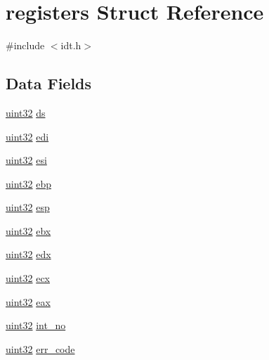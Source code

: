\hypertarget{structregisters}{
\section{registers Struct Reference}
\label{structregisters}
}


{\ttfamily \#include $<$idt.h$>$}

\subsection*{Data Fields}
\begin{DoxyCompactItemize}
\item 
\hyperlink{int__types_8h_a1134b580f8da4de94ca6b1de4d37975e}{uint32} \hyperlink{structregisters_a5bca43779caa99b6546c67c92fa96795}{ds}
\item 
\hyperlink{int__types_8h_a1134b580f8da4de94ca6b1de4d37975e}{uint32} \hyperlink{structregisters_a21389bd4fcf274118c6adf12a24c9889}{edi}
\item 
\hyperlink{int__types_8h_a1134b580f8da4de94ca6b1de4d37975e}{uint32} \hyperlink{structregisters_a6adf8439e8b2f6dfbd9f3a687ccf4d14}{esi}
\item 
\hyperlink{int__types_8h_a1134b580f8da4de94ca6b1de4d37975e}{uint32} \hyperlink{structregisters_a35adc6b8d5597dfee367ff90f615c948}{ebp}
\item 
\hyperlink{int__types_8h_a1134b580f8da4de94ca6b1de4d37975e}{uint32} \hyperlink{structregisters_aed2ad213a3e6d7cd3c5b922f1ad2d022}{esp}
\item 
\hyperlink{int__types_8h_a1134b580f8da4de94ca6b1de4d37975e}{uint32} \hyperlink{structregisters_a267e7e19e0c7d75c747b6b44d7420896}{ebx}
\item 
\hyperlink{int__types_8h_a1134b580f8da4de94ca6b1de4d37975e}{uint32} \hyperlink{structregisters_a3fe3dcfbcff14bf929883527112338d2}{edx}
\item 
\hyperlink{int__types_8h_a1134b580f8da4de94ca6b1de4d37975e}{uint32} \hyperlink{structregisters_a5b930ca144576e0937f838c546d8d015}{ecx}
\item 
\hyperlink{int__types_8h_a1134b580f8da4de94ca6b1de4d37975e}{uint32} \hyperlink{structregisters_ae646012d16da46b9b898a1857a176328}{eax}
\item 
\hyperlink{int__types_8h_a1134b580f8da4de94ca6b1de4d37975e}{uint32} \hyperlink{structregisters_afadd3a7e92865f4a39c222084541a641}{int\_\-no}
\item 
\hyperlink{int__types_8h_a1134b580f8da4de94ca6b1de4d37975e}{uint32} \hyperlink{structregisters_ac97513133986d639baa5b49031b661cc}{err\_\-code}

\end{DoxyCompactItemize}
